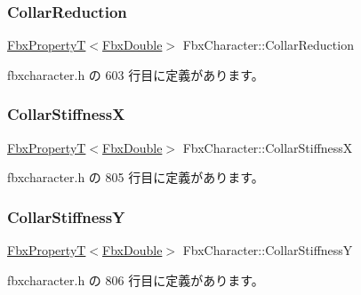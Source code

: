 \mbox{\label{class_fbx_character_ac3906f09d97af9fea25de19b1faab968}} 
\subsubsection{\texorpdfstring{Collar\+Reduction}{CollarReduction}}
{\footnotesize\ttfamily \hyperlink{class_fbx_property_t}{Fbx\+PropertyT}$<$\hyperlink{fbxtypes_8h_a171e72a1c46fc15c1a6c9c31948c1c5b}{Fbx\+Double}$>$ Fbx\+Character\+::\+Collar\+Reduction}



 fbxcharacter.\+h の 603 行目に定義があります。

\mbox{\label{class_fbx_character_a02276549abd3825a728faf703dc76cc7}} 
\subsubsection{\texorpdfstring{Collar\+StiffnessX}{CollarStiffnessX}}
{\footnotesize\ttfamily \hyperlink{class_fbx_property_t}{Fbx\+PropertyT}$<$\hyperlink{fbxtypes_8h_a171e72a1c46fc15c1a6c9c31948c1c5b}{Fbx\+Double}$>$ Fbx\+Character\+::\+Collar\+StiffnessX}



 fbxcharacter.\+h の 805 行目に定義があります。

\mbox{\label{class_fbx_character_a13377b6a419571905e106f44f31c7c8e}} 
\subsubsection{\texorpdfstring{Collar\+StiffnessY}{CollarStiffnessY}}
{\footnotesize\ttfamily \hyperlink{class_fbx_property_t}{Fbx\+PropertyT}$<$\hyperlink{fbxtypes_8h_a171e72a1c46fc15c1a6c9c31948c1c5b}{Fbx\+Double}$>$ Fbx\+Character\+::\+Collar\+StiffnessY}



 fbxcharacter.\+h の 806 行目に定義があります。

